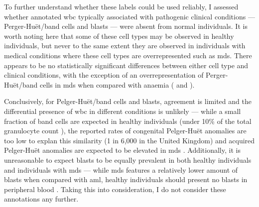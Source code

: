 \begin{figure}[!ht]
    \label{fig:mile-vice-annotated-cells-wbc-concordance}
\end{figure}

\begin{figure}[!ht]
    \label{fig:mile-vice-annotated-cells-wbc-concordance-heatmap}
\end{figure}

To further understand whether these labels could be used reliably, I assessed whether annotated \ac{wbc} typically associated with pathogenic clinical conditions --- Perger-Huët/band cells and blasts --- were absent from normal individuals. It is worth noting here that some of these cell types may be observed in healthy individuals, but never to the same extent they are observed in individuals with medical conditions where these cell types are overrepresented such as \ac{mds}. There appears to be no statistically significant differences between either cell type and clinical conditions, with the exception of an overrepresentation of Perger-Huët/band cells in \ac{mds} when compared with anaemia ( and ). 

\begin{figure}[!ht]
    \label{fig:annotated-wbc-rate}
\end{figure}

\begin{figure}[!ht]
    \label{fig:annotated-wbc-rate-test}
\end{figure}

Conclusively, for Pelger-Huët/band cells and blasts, agreement is limited and the differential presence of \ac{wbc} in different conditions is unlikely --- while a small fraction of band cells are expected in healthy individuals (under 10\% of the total granulocyte count \cite{Drees2012-sz}), the reported rates of congenital Pelger-Huët anomalies are too low to explan this similarity (1 in 6,000 in the United Kingdom) and acquired Pelger-Huët anomalies are expected to be elevated in \ac{mds} \cite{Colella2012-so}. Additionally, it is unreasonable to expect blasts to be equally prevalent in both healthy individuals and individuals with \ac{mds} --- while \ac{mds} features a relatively lower amount of blasts when compared with \ac{aml}, healthy individuals should present no blasts in peripheral blood \cite{Aster2020-cu}. Taking this into consideration, I do not consider these annotations any further.

